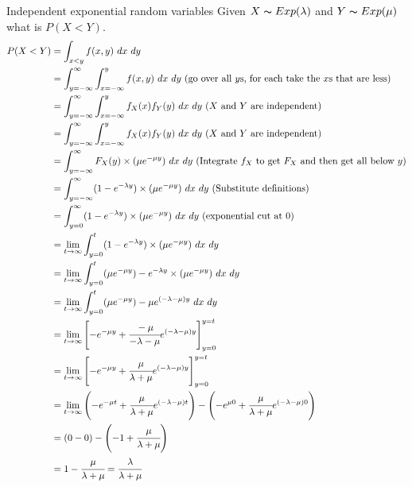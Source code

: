 \begin{examplebox}{Independent exponential random variables}
	Given $X \thicksim Exp(\lambda)$ and $Y \thicksim Exp(\mu)$ what is $P(X < Y)$.
	\[\begin{split}
			P(X < Y) & = \int_{x<y} f(x,y) \ dx \ dy \\
			& = \int_{y = -\infty}^{\infty} \int_{x = -\infty}^{y} f(x,y) \ dx \ dy \ \text{(go over all $y$s, for each take the $x$s that are less)} \\
			& = \int_{y = -\infty}^{\infty} \int_{x = -\infty}^{y} f_X(x)f_Y(y) \ dx \ dy \ \text{($X$ and $Y$ are independent)} \\
			& = \int_{y = -\infty}^{\infty} \int_{x = -\infty}^{y} f_X(x)f_Y(y) \ dx \ dy \ \text{($X$ and $Y$ are independent)} \\
			& = \int_{y = -\infty}^{\infty} F_X(y) \times (\mu e^{- \mu y}) \ dx \ dy \ \text{(Integrate $f_X$ to get $F_X$ and then get all below $y$)}\\
			& = \int_{y = -\infty}^{\infty} (1 - e^{- \lambda y}) \times (\mu e^{- \mu y}) \ dx \ dy  \ \text{(Substitute definitions)}\\
			& = \int_{y = 0}^{\infty} (1 - e^{- \lambda y}) \times (\mu e^{- \mu y}) \ dx \ dy \ \text{(exponential cut at 0)}\\
			& = \lim_{t \to \infty} \int_{y = 0}^{t} (1 - e^{- \lambda y}) \times (\mu e^{- \mu y}) \ dx \ dy\\
			& = \lim_{t \to \infty} \int_{y = 0}^{t} (\mu e^{- \mu y}) - e^{- \lambda y} \times (\mu e^{- \mu y})  \ dx \ dy \\
			& = \lim_{t \to \infty} \int_{y = 0}^{t} (\mu e^{- \mu y}) - \mu e^{(- \lambda - \mu) y}  \ dx \ dy \\
			& = \lim_{t \to \infty} \left[  -e^{-\mu y} + \cfrac{- \mu}{- \lambda - \mu}e^{(-\lambda -\mu)y} \right]_{y=0}^{y=t} \\
			& = \lim_{t \to \infty} \left[  -e^{-\mu y} + \cfrac{\mu}{\lambda + \mu}e^{(-\lambda -\mu)y} \right]_{y=0}^{y=t} \\
			& = \lim_{t \to \infty} \left(  -e^{-\mu t} + \cfrac{\mu}{\lambda + \mu}e^{(-\lambda -\mu)t} \right) - \left(  -e^{\mu 0} + \cfrac{\mu}{\lambda + \mu}e^{(-\lambda -\mu)0} \right) \\
			& = \left(  0 - 0 \right) - \left(  -1 + \cfrac{\mu}{\lambda + \mu} \right) \\
			& = 1 - \cfrac{\mu}{\lambda + \mu} = \cfrac{\lambda}{\lambda + \mu} \\
		\end{split}\]
    \end{examplebox}
